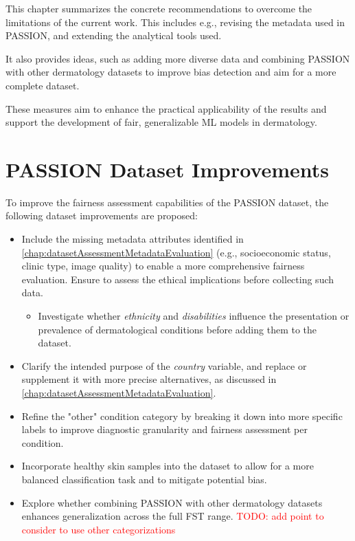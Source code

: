 \documentclass[12pt, a4paper, oneside]{book}   	%
\renewcommand{\todo}[1]{\textcolor{red}{TODO: #1}}
\begin{document}
		This chapter summarizes the concrete recommendations to overcome the limitations of the current work. This includes e.g., revising the metadata used in PASSION, and extending the analytical tools used.
		
		It also provides ideas, such as adding more diverse data and combining PASSION with other dermatology datasets to improve bias detection and aim for a more complete dataset.
		
		These measures aim to enhance the practical applicability of the results and support the development of fair, generalizable \gls{ML} models in dermatology.
	
		
		\section{PASSION Dataset Improvements}
		To improve the fairness assessment capabilities of the PASSION dataset, the following dataset improvements are proposed:
		\begin{itemize}
			\item Include the missing metadata attributes identified in \autoref{chap:datasetAssessmentMetadataEvaluation} (e.g., socioeconomic status, clinic type, image quality) to enable a more comprehensive fairness evaluation. Ensure to assess the ethical implications before collecting such data.
			\begin{itemize}
				\item Investigate whether \textit{ethnicity} and \textit{disabilities} influence the presentation or prevalence of dermatological conditions before adding them to the dataset.
			\end{itemize}
						
			\item Clarify the intended purpose of the \textit{country} variable, and replace or supplement it with more precise alternatives, as discussed in \autoref{chap:datasetAssessmentMetadataEvaluation}.
			
			\item Refine the "other" condition category by breaking it down into more specific labels to improve diagnostic granularity and fairness assessment per condition.
			
			\item Incorporate healthy skin samples into the dataset to allow for a more balanced classification task and to mitigate potential bias.
			
			\item Explore whether combining PASSION with other dermatology datasets enhances generalization across the full \gls{FST} range. \todo{add point to consider to use other categorizations}
		\end{itemize}
		
\end{document}
